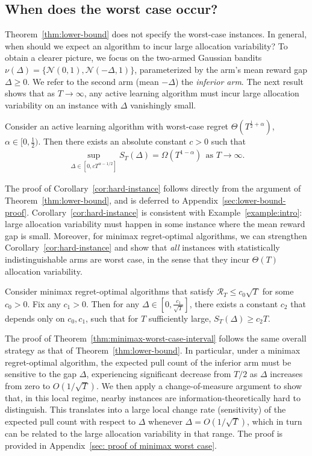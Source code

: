 \documentclass[nonblindrev]{informs3_noinforms}
\begin{document}
{\subsection{When does the worst case occur?}\label{sec: worst case}
Theorem~\ref{thm:lower-bound} does not specify the worst-case instances.  In general, when should we expect an algorithm to incur large allocation variability? To obtain a clearer picture, we focus on the two-armed Gaussian bandits $\nu(\Delta) = \{\mathcal{N}(0, 1), \mathcal{N}(-\Delta, 1)\}$, parameterized by the arm's mean reward gap $\Delta \ge 0.$ We refer to the second arm (mean $-\Delta$) the \textit{inferior arm}. The next result shows that as $T \to \infty$, any active learning algorithm must incur large allocation variability on an instance with $\Delta$ vanishingly small. 
\begin{corollary}\label{cor:hard-instance}
    {Consider an active learning algorithm with worst-case regret $\Theta (T^{\frac{1}{2}+\alpha})$, $\alpha\in[0,\frac{1}{2})$. Then there exists an absolute constant $c > 0$ such that  
    \begin{align*}
        \sup_{\Delta\in[0,c T^{\alpha-1/2}]}S_T(\Delta)=\Omega(T^{1-\alpha}) \ \ \text{as }T\rightarrow\infty.
    \end{align*}} 
\end{corollary}
The proof of Corollary~\ref{cor:hard-instance} follows directly from the argument of Theorem~\ref{thm:lower-bound}, and is deferred to Appendix~\ref{sec:lower-bound-proof}. Corollary~\ref{cor:hard-instance} is consistent with Example~\ref{example:intro}: large allocation variability must happen in some instance where the mean reward gap is small. Moreover, for minimax regret-optimal algorithms, we can strengthen Corollary~\ref{cor:hard-instance} and show that \emph{all} instances with statistically indistinguishable arms are worst case, in the sense that they incur $\Theta(T)$ allocation variability.

\begin{theorem}\label{thm:minimax-worst-case-interval}  
Consider minimax regret-optimal algorithms that satisfy $\mathcal{R}_T \le c_0 \sqrt{T}$ for some $c_0 > 0$. Fix any $c_1 > 0$. Then for any $\Delta \in \left[0, \frac{c_1}{\sqrt{T}}\right]$, there exists a constant $c_2$ that depends only on $c_0, c_1$, such that for  $T$ sufficiently large, $S_T(\Delta) \ge  c_2 T.$
\end{theorem}
The proof of Theorem~\ref{thm:minimax-worst-case-interval} follows the same overall strategy as that of Theorem~\ref{thm:lower-bound}. In particular, under a minimax regret-optimal algorithm, the expected pull count of the inferior arm must be sensitive to the gap $\Delta$, experiencing significant decrease from $T/2$ as $\Delta$ increases from zero to $O(1/\sqrt{T})$. We then apply a change-of-measure argument to show that, in this local regime, nearby instances are information-theoretically hard to distinguish. This translates into a large local change rate (sensitivity) of the expected pull count with respect to $\Delta$ whenever $\Delta= O(1/\sqrt{T})$, which in turn can be related to the large allocation variability in that range. The proof is provided in Appendix~\ref{sec: proof of minimax worst case}.

}
\end{document}
